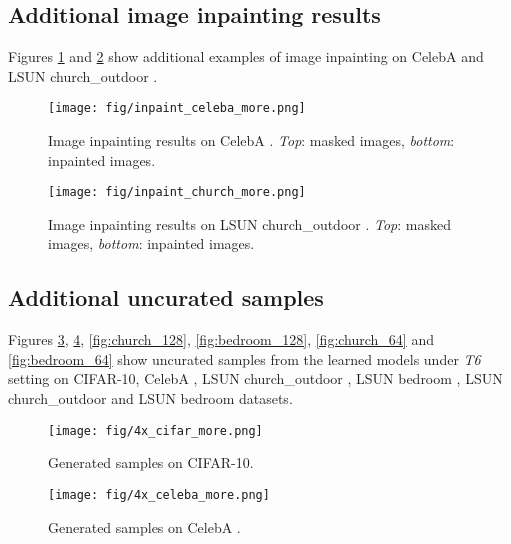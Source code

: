 \documentclass{article} \usepackage{iclr2021_conference,times}
\begin{document}
\subsection{Additional image inpainting results} \label{app:inpaint}
Figures \ref{fig: inpaint-celeba} and \ref{fig: inpaint-church} show additional examples of image inpainting on CelebA  and LSUN church\_outdoor . 

\begin{figure}[ht]
\begin{center}
\texttt{[image: fig/inpaint\_celeba\_more.png]} 
\end{center}
\caption{Image inpainting results on CelebA . {\em Top}: masked images, {\em bottom}: inpainted images.}
\label{fig: inpaint-celeba}
\end{figure}

\begin{figure}[ht]
\begin{center}
\texttt{[image: fig/inpaint\_church\_more.png]} 
\end{center}
\caption{Image inpainting results on LSUN church\_outdoor . {\em Top}: masked images, {\em bottom}: inpainted images.}
\label{fig: inpaint-church}
\end{figure}

\subsection{Additional uncurated samples} \label{app:samples}
Figures \ref{fig:cifar}, \ref{fig:celeba}, \ref{fig:church_128}, \ref{fig:bedroom_128}, \ref{fig:church_64} and \ref{fig:bedroom_64} show uncurated samples from the learned models under {\em T6} setting on CIFAR-10, CelebA , LSUN church\_outdoor , LSUN bedroom , LSUN church\_outdoor  and LSUN bedroom  datasets. 


\begin{figure}[ht]
\begin{center}
\texttt{[image: fig/4x\_cifar\_more.png]}
\end{center}
\caption{Generated samples on CIFAR-10. }
\label{fig:cifar}
\end{figure}

\begin{figure}[ht]
\begin{center}
\texttt{[image: fig/4x\_celeba\_more.png]}
\end{center}
\caption{Generated samples on CelebA . }
\label{fig:celeba}
\end{figure}
\end{document}
